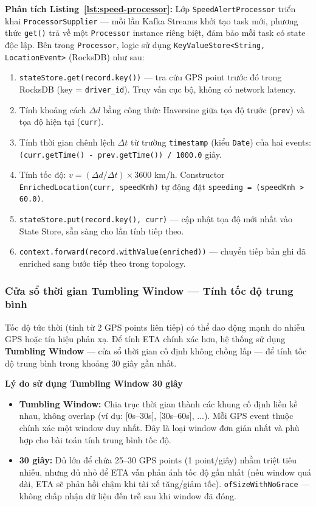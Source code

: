 \bigskip
\noindent
\textbf{Phân tích Listing~\ref{lst:speed-processor}:} Lớp \texttt{SpeedAlertProcessor} triển khai \texttt{ProcessorSupplier} — mỗi lần Kafka Streams khởi tạo task mới, phương thức \texttt{get()} trả về một \texttt{Processor} instance riêng biệt, đảm bảo mỗi task có state độc lập. Bên trong \texttt{Processor}, logic sử dụng \texttt{KeyValueStore<String, LocationEvent>} (RocksDB) như sau:
\begin{enumerate}
    \item \texttt{stateStore.get(record.key())} — tra cứu GPS point trước đó trong RocksDB (key = \texttt{driver\_id}). Truy vấn cục bộ, không có network latency.
    \item Tính khoảng cách $\Delta d$ bằng công thức Haversine giữa tọa độ trước (\texttt{prev}) và tọa độ hiện tại (\texttt{curr}).
    \item Tính thời gian chênh lệch $\Delta t$ từ trường \texttt{timestamp} (kiểu \texttt{Date}) của hai events: \texttt{(curr.getTime() - prev.getTime()) / 1000.0} giây.
    \item Tính tốc độ: $v = (\Delta d / \Delta t) \times 3600$ km/h. Constructor \texttt{EnrichedLocation(curr, speedKmh)} tự động đặt \texttt{speeding = (speedKmh > 60.0)}.
    \item \texttt{stateStore.put(record.key(), curr)} — cập nhật tọa độ mới nhất vào State Store, sẵn sàng cho lần tính tiếp theo.
    \item \texttt{context.forward(record.withValue(enriched))} — chuyển tiếp bản ghi đã enriched sang bước tiếp theo trong topology.
\end{enumerate}

\subsubsection{Cửa sổ thời gian Tumbling Window — Tính tốc độ trung bình}
\label{sec:windowed-aggregation}

Tốc độ tức thời (tính từ 2 GPS points liên tiếp) có thể dao động mạnh do nhiễu GPS hoặc tín hiệu phản xạ. Để tính ETA chính xác hơn, hệ thống sử dụng \textbf{Tumbling Window} — cửa sổ thời gian cố định không chồng lấp — để tính tốc độ trung bình trong khoảng 30 giây gần nhất.

\bigskip
\noindent
\textbf{Lý do sử dụng Tumbling Window 30 giây}
\begin{itemize}
    \item \textbf{Tumbling Window:} Chia trục thời gian thành các khung cố định liền kề nhau, không overlap (ví dụ: [0s--30s], [30s--60s], ...). Mỗi GPS event thuộc chính xác một window duy nhất. Đây là loại window đơn giản nhất và phù hợp cho bài toán tính trung bình tốc độ.
    \item \textbf{30 giây:} Đủ lớn để chứa 25--30 GPS points (1 point/giây) nhằm triệt tiêu nhiễu, nhưng đủ nhỏ để ETA vẫn phản ánh tốc độ gần nhất (nếu window quá dài, ETA sẽ phản hồi chậm khi tài xế tăng/giảm tốc). \texttt{ofSizeWithNoGrace} — không chấp nhận dữ liệu đến trễ sau khi window đã đóng.
\end{itemize}

